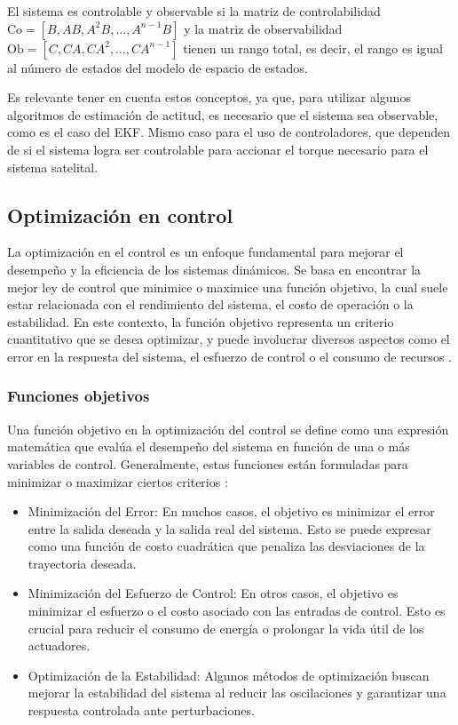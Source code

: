 El sistema es controlable y observable si la matriz de controlabilidad $\text{Co} = [B, AB, A^2B, \ldots, A^{n-1}B]$ y la matriz de observabilidad $\text{Ob} = [C, CA, CA^2, \ldots, CA^{n-1}]$ tienen un rango total, es decir, el rango es igual al número de estados del modelo de espacio de estados.

Es relevante tener en cuenta estos conceptos, ya que, para utilizar algunos algoritmos de estimación de actitud, es necesario que el sistema sea observable, como es el caso del EKF. Mismo caso para el uso de controladores, que dependen de si el sistema logra ser controlable para accionar el torque necesario para el sistema satelital.

\subsection{Optimización en control}

La optimización en el control es un enfoque fundamental para mejorar el desempeño y la eficiencia de los sistemas dinámicos. Se basa en encontrar la mejor ley de control que minimice o maximice una función objetivo, la cual suele estar relacionada con el rendimiento del sistema, el costo de operación o la estabilidad. En este contexto, la función objetivo representa un criterio cuantitativo que se desea optimizar, y puede involucrar diversos aspectos como el error en la respuesta del sistema, el esfuerzo de control o el consumo de recursos \cite{ref30}.

\subsubsection{Funciones objetivos}

Una función objetivo en la optimización del control se define como una expresión matemática que evalúa el desempeño del sistema en función de una o más variables de control. Generalmente, estas funciones están formuladas para minimizar o maximizar ciertos criterios \cite{ref30}:

\begin{itemize}
	\item Minimización del Error: En muchos casos, el objetivo es minimizar el error entre la salida deseada y la salida real del sistema. Esto se puede expresar como una función de costo cuadrática que penaliza las desviaciones de la trayectoria deseada.
	\item Minimización del Esfuerzo de Control: En otros casos, el objetivo es minimizar el esfuerzo o el costo asociado con las entradas de control. Esto es crucial para reducir el consumo de energía o prolongar la vida útil de los actuadores.
	\item Optimización de la Estabilidad: Algunos métodos de optimización buscan mejorar la estabilidad del sistema al reducir las oscilaciones y garantizar una respuesta controlada ante perturbaciones.
\end{itemize}


